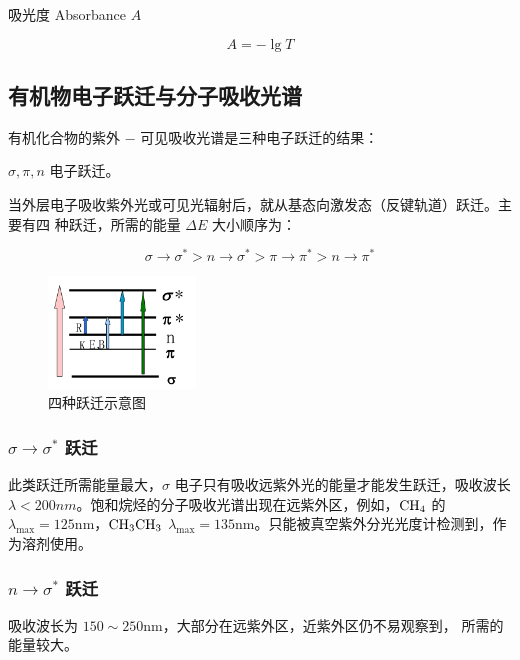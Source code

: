 吸光度 Absorbance $A$

\begin{equation}
    A = - \lg T
\end{equation}

\subsection{有机物电子跃迁与分子吸收光谱}

有机化合物的紫外 $-$ 可见吸收光谱是三种电子跃迁的结果：

$\sigma, \pi, n$ 电子跃迁。

当外层电子吸收紫外光或可见光辐射后，就从基态向激发态（反键轨道）跃迁。主要有四
种跃迁，所需的能量 $\Delta E$ 大小顺序为：

\begin{equation}
    \sigma \rightarrow \sigma^* > n \rightarrow \sigma^*
    > \pi \rightarrow \pi^* > n \rightarrow \pi^*
\end{equation}

\begin{figure}[H]
    \centering
    \includegraphics[width=0.35\textwidth]{images/UV-Vis-orbit.png}
    \caption{四种跃迁示意图}
\end{figure}


\subsubsection{$\sigma \rightarrow \sigma^*$ 跃迁}

此类跃迁所需能量最大，$\sigma$ 电子只有吸收远紫外光的能量才能发生跃迁，吸收波长
$\lambda < 200 nm$。饱和烷烃的分子吸收光谱出现在远紫外区，例如，$\ce{CH4}$ 的
$\lambda_{\max} = 125 \mathrm{nm}$，$\ce{CH3CH3}$ $\lambda_{\max} = 135
    \mathrm{nm}$。只能被真空紫外分光光度计检测到，作为溶剂使用。

\subsubsection{$n \rightarrow \sigma^*$ 跃迁}

吸收波长为 $ 150 \sim 250 \mathrm{nm} $，大部分在远紫外区，近紫外区仍不易观察到，
所需的能量较大。

